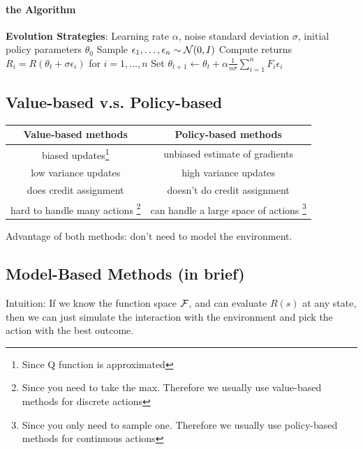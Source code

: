 \documentclass[11pt]{article}
\begin{document}
\paragraph{the Algorithm}
\begin{algorithm}[H]
\begin{algorithmic}
\State {} \textbf{Evolution Strategies}:
\State {} Learning rate $\alpha$, noise standard deviation $\sigma$, initial policy parameters $\theta_0$
\State Sample $\epsilon_1, \hdots, \epsilon_n \sim \mathcal{N}(0,I)$
\State Compute returns $R_i = R(\theta_t + \sigma \epsilon_i)$ for $i = 1, \hdots, n$
\State Set $\theta_{t+1} \gets \theta_t + \alpha \frac{1}{n\sigma}\sum_{i=1}^n F_i\epsilon_i$
\EndFor
\end{algorithmic}
\end{algorithm}

\subsection{Value-based v.s. Policy-based}
\begin{center}
\begin{tabular}{ |c|c| } 
 \hline
  Value-based methods & Policy-based methods \\ 
  \hline\hline
  biased updates\footnote{Since Q function is approximated} & unbiased estimate of gradients\\
  \hline
  low variance updates & high variance updates  \\ 
  \hline
  does credit assignment & doesn't do credit assignment \\ 
  \hline
  hard to handle many actions \footnote{Since you need to take the max. Therefore we usually use value-based methods for discrete actions} & can handle a large space of actions \footnote{Since you only need to sample one. Therefore we usually use policy-based methods for continuous actions}\\
 \hline
\end{tabular}
\end{center}
Advantage of both methods: don't need to model the environment.

\subsection{Model-Based Methods (in brief)}
Intuition: If we know the function space $\mathcal{F}$, and can evaluate $R(s)$ at any state, then we can just simulate the interaction with the environment and pick the action with the best outcome.
 

    
\end{document}
